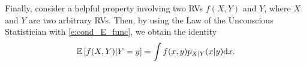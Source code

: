 %

Finally, consider a helpful property involving two RVs $f(X, Y)$ and $Y$, where $X$ and $Y$ are two arbitrary RVs.
%
Then, by using the Law of the Unconscious Statistician with \eqref{e:cond_E_func}, we obtain the identity
%
%
\begin{equation}\label{e:f_x_y_cond_y}
    \mathbb{E}\left [f(X,Y)|Y=y\right ] = \int f(x,y) p_{X|Y}(x|y) \mathrm{d} x.
\end{equation}